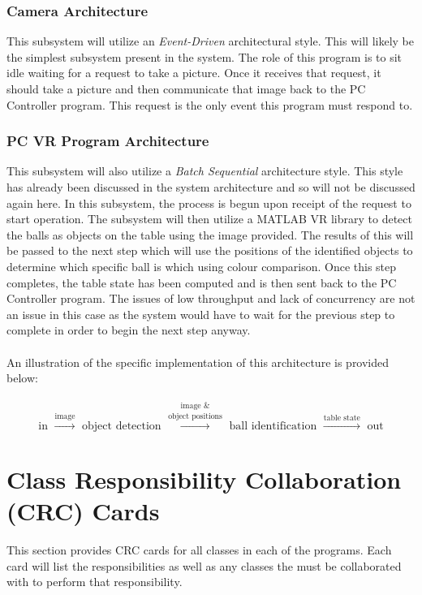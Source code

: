 \documentclass[titlepage]{article}
\begin{document}
\subsubsection{Camera Architecture}
This subsystem will utilize an \textit{Event-Driven} architectural style. This will likely be the simplest subsystem present in the system. The role of this program is to sit idle waiting for a request to take a picture. Once it receives that request, it should take a picture and then communicate that image back to the PC Controller program. This request is the only event this program must respond to.
\subsubsection{PC VR Program Architecture}
This subsystem will also utilize a \textit{Batch Sequential} architecture style. This style has already been discussed in the system architecture and so will not be discussed again here. In this subsystem, the process is begun upon receipt of the request to start operation. The subsystem will then utilize a MATLAB VR library to detect the balls as objects on the table using the image provided. The results of this will be passed to the next step which will use the positions of the identified objects to determine which specific ball is which using colour comparison. Once this step completes, the table state has been computed and is then sent back to the PC Controller program. The issues of low throughput and lack of concurrency are not an issue in this case as the system would have to wait for the previous step to complete in order to begin the next step anyway.\\~\\

An illustration of the specific implementation of this architecture is provided below:\\~\\
$$\text{in } \xrightarrow{\text{image}} \text{ object detection } \overset{\text{image \&}}{\xrightarrow{\text{object positions}}} \text{ ball identification } \xrightarrow{\text{table state}} \text{ out}$$
\label{fig:PC VR Architecture}



\section{Class Responsibility Collaboration (CRC) Cards}
This section provides CRC cards for all classes in each of the programs. Each card will list the responsibilities as well as any classes the must be collaborated with to perform that responsibility.
\newpage
\end{document}

